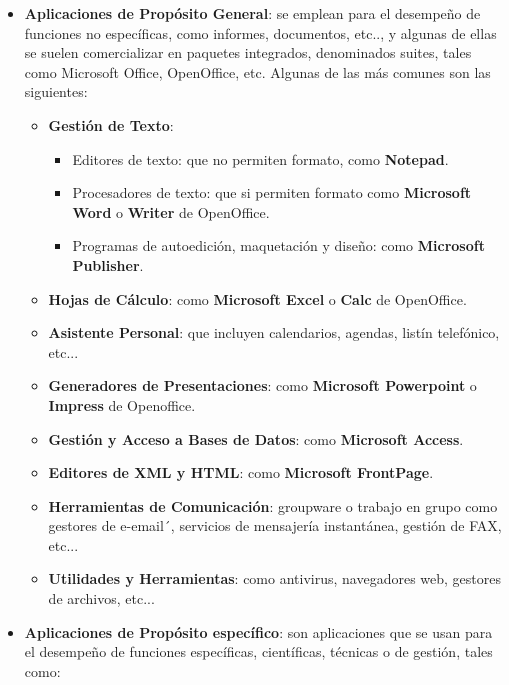 \begin{itemize}
    \item \textbf{Aplicaciones de Propósito General}: se emplean para el desempeño de funciones no específicas, como informes, documentos, etc.., y algunas de ellas se suelen comercializar en paquetes integrados, denominados suites, tales como Microsoft Office, OpenOffice, etc. Algunas de las más comunes son las siguientes:

    \begin{itemize}
        \item \textbf{Gestión de Texto}:
        \begin{itemize}
            \item Editores de texto: que no permiten formato, como \textbf{Notepad}.
            \item Procesadores de texto: que si permiten formato como \textbf{Microsoft Word} o \textbf{Writer} de OpenOffice.
            \item Programas de autoedición, maquetación y diseño: como \textbf{Microsoft Publisher}.
        \end{itemize}

        \item \textbf{Hojas de Cálculo}: como \textbf{Microsoft Excel} o \textbf{Calc} de OpenOffice.
        \item \textbf{Asistente Personal}: que incluyen calendarios, agendas, listín telefónico, etc...
        \item \textbf{Generadores de Presentaciones}: como \textbf{Microsoft Powerpoint} o \textbf{Impress} de Openoffice.
        \item \textbf{Gestión y Acceso a Bases de Datos}: como \textbf{Microsoft Access}.
        \item \textbf{Editores de XML y HTML}: como \textbf{Microsoft FrontPage}.
        \item \textbf{Herramientas de Comunicación}: groupware o trabajo en grupo como gestores de e-email´, servicios de mensajería instantánea, gestión de FAX, etc...
        \item \textbf{Utilidades y Herramientas}: como antivirus, navegadores web, gestores de archivos, etc...
    \end{itemize}

    \item \textbf{Aplicaciones de Propósito específico}: son aplicaciones que se usan para el desempeño de funciones específicas, científicas, técnicas o de gestión, tales como:


\end{itemize}
